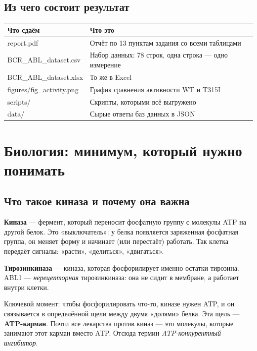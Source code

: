\documentclass[11pt,a4paper]{article}
\newcommand{\code}[1]{{\ttfamily #1}}
\begin{document}
\subsection{Из чего состоит результат}

\begin{center}
\begin{tabular}{L{4.6cm}L{10cm}}
\toprule
\textbf{Что сдаём} & \textbf{Что это} \\
\midrule
\code{report.pdf} & Отчёт по 13 пунктам задания со всеми таблицами \\
\code{BCR\_ABL\_dataset.csv} & Набор данных: 78 строк, одна строка --- одно измерение \\
\code{BCR\_ABL\_dataset.xlsx} & То же в Excel \\
\code{figures/fig\_activity.png} & График сравнения активности WT и T315I \\
\code{scripts/} & Скрипты, которыми всё выгружено \\
\code{data/} & Сырые ответы баз данных в JSON \\
\bottomrule
\end{tabular}
\end{center}

\section{Биология: минимум, который нужно понимать}

\subsection{Что такое киназа и почему она важна}

\textbf{Киназа} --- фермент, который переносит фосфатную группу с молекулы ATP на
другой белок. Это «выключатель»: у белка появляется заряженная фосфатная группа,
он меняет форму и начинает (или перестаёт) работать. Так клетка передаёт сигналы:
«расти», «делиться», «двигаться».

\textbf{Тирозинкиназа} --- киназа, которая фосфорилирует именно остатки тирозина.
ABL1 --- \emph{нерецепторная} тирозинкиназа: она не сидит в мембране, а работает
внутри клетки.

Ключевой момент: чтобы фосфорилировать что-то, киназе нужен ATP, и он связывается
в определённой щели между двумя «долями» белка. Эта щель --- \textbf{ATP-карман}.
Почти все лекарства против киназ --- это молекулы, которые занимают этот карман
вместо ATP. Отсюда термин \emph{ATP-конкурентный ингибитор}.
\end{document}
